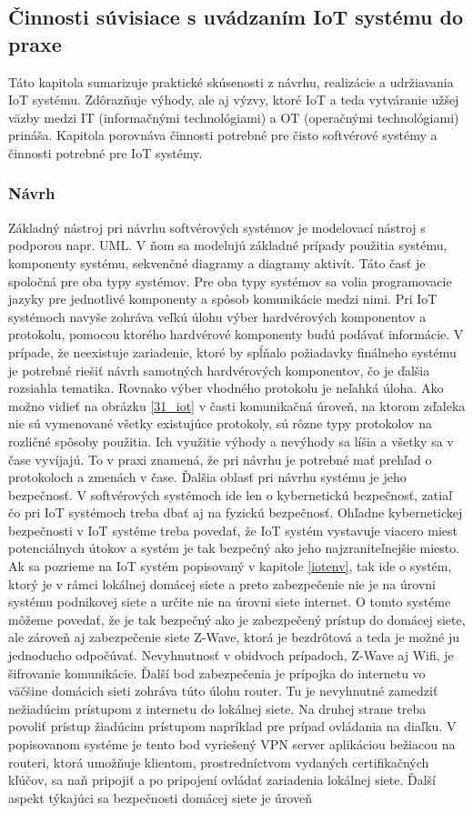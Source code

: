 \subsection{Činnosti súvisiace s uvádzaním IoT systému do praxe}
Táto kapitola sumarizuje praktické skúsenosti z návrhu, realizácie a udržiavania IoT systému. Zdôrazňuje výhody, ale aj výzvy, ktoré  IoT a teda vytváranie užšej väzby medzi IT (informačnými technológiami) a OT (operačnými technológiami) prináša. Kapitola porovnáva činnosti potrebné pre čisto softvérové systémy a činnosti potrebné pre IoT systémy. 
\subsubsection{Návrh}
Základný nástroj pri návrhu softvérových systémov je modelovací nástroj s podporou napr. UML. V ňom sa modelujú základné prípady použitia systému, komponenty systému, sekvenčné diagramy a diagramy aktivít. Táto časť je spoločná pre oba typy systémov. Pre oba typy systémov sa volia programovacie jazyky pre jednotlivé komponenty a spôsob komunikácie medzi nimi. Pri IoT systémoch navyše zohráva veľkú úlohu výber hardvérových komponentov a protokolu, pomocou ktorého hardvérové komponenty budú podávať informácie. V prípade, že neexistuje zariadenie, ktoré by spĺňalo požiadavky finálneho systému je potrebné riešiť návrh samotných hardvérových komponentov, čo je ďalšia rozsiahla tematika. Rovnako výber vhodného protokolu je neľahká úloha. Ako možno vidieť na obrázku \ref{31_iot} v časti komunikačná úroveň, na ktorom zďaleka nie sú vymenované všetky existujúce protokoly, sú rôzne typy protokolov na rozličné spôsoby použitia. Ich využitie výhody a nevýhody sa líšia a všetky sa v čase vyvíjajú. To v praxi znamená, že pri návrhu je potrebné mať prehľad o protokoloch a zmenách v čase. Ďalšia oblasť pri návrhu systému je jeho bezpečnosť. V softvérových systémoch ide len o kybernetickú bezpečnosť, zatiaľ čo pri IoT systémoch treba dbať aj na fyzickú bezpečnosť. Ohľadne kybernetickej bezpečnosti v IoT systéme treba povedať, že IoT systém vystavuje viacero miest potenciálnych útokov a systém je tak bezpečný ako jeho najzraniteľnejšie miesto. Ak sa pozrieme na IoT systém popisovaný v kapitole \ref{iotenv}, tak ide o systém, ktorý je v rámci lokálnej domácej siete a preto zabezpečenie nie je na úrovni systému podnikovej siete a určite nie na úrovni siete internet.  O tomto systéme môžeme povedať, že je tak bezpečný ako je zabezpečený prístup do domácej siete, ale zároveň aj zabezpečenie siete Z-Wave, ktorá je bezdrôtová a teda je možné ju jednoducho odpočúvať. Nevyhnutnosť v obidvoch prípadoch, Z-Wave aj Wifi, je šifrovanie komunikácie. Ďalší bod zabezpečenia je prípojka do internetu vo väčšine domácich sieti zohráva túto úlohu router. Tu je nevyhnutné zamedziť nežiadúcim prístupom z internetu do lokálnej siete. Na druhej strane treba povoliť prístup žiadúcim prístupom napríklad pre prípad ovládania na diaľku. V popisovanom systéme je tento bod vyriešený VPN server aplikáciou bežiacou na routeri, ktorá umožňuje klientom, prostredníctvom vydaných certifikačných kľúčov, sa naň pripojiť a po pripojení ovládať zariadenia lokálnej siete. Ďalší aspekt týkajúci sa bezpečnosti domácej siete je úroveň 